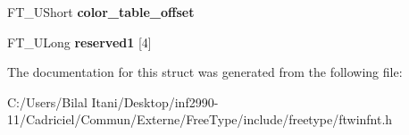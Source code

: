 \begin{DoxyCompactItemize}
\item 
F\+T\+\_\+\+U\+Short {\bfseries color\+\_\+table\+\_\+offset}\hypertarget{struct_f_t___win_f_n_t___header_rec___a83fa51bfd7fe814f8264416204701c60}{}\label{struct_f_t___win_f_n_t___header_rec___a83fa51bfd7fe814f8264416204701c60}

\item 
F\+T\+\_\+\+U\+Long {\bfseries reserved1} \mbox{[}4\mbox{]}\hypertarget{struct_f_t___win_f_n_t___header_rec___af01de9742608fb7a2a603d062f3783e3}{}\label{struct_f_t___win_f_n_t___header_rec___af01de9742608fb7a2a603d062f3783e3}

\end{DoxyCompactItemize}


The documentation for this struct was generated from the following file\+:\begin{DoxyCompactItemize}
\item 
C\+:/\+Users/\+Bilal Itani/\+Desktop/inf2990-\/11/\+Cadriciel/\+Commun/\+Externe/\+Free\+Type/include/freetype/ftwinfnt.\+h\end{DoxyCompactItemize}
